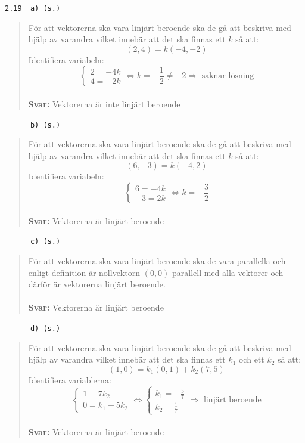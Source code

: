\documentclass[a4paper]{article}
\newcommand{\tskcol}[1]{\textcolor{tskcol}{#1}}
\begin{document}
\texttt{\tskcol{2.19~~a) (s.)}}
\begin{quotation}
	\noindent
	För att vektorerna ska vara linjärt beroende ska de gå att beskriva med hjälp av varandra vilket innebär att det ska finnas ett $k$ så att:
	\[(2,4)=k(-4,-2)\]
	Identifiera variabeln:
	\[\begin{cases}
	2=-4k \\
	4=-2k
	\end{cases} \Leftrightarrow
	k=-\frac{1}{2}\neq-2 \Rightarrow \text{ saknar lösning}\]
	\\
	\textbf{Svar:} Vektorerna är inte linjärt beroende
\end{quotation}

\texttt{\tskcol{~~~~~~b) (s.)}}
\begin{quotation}
	\noindent
	För att vektorerna ska vara linjärt beroende ska de gå att beskriva med hjälp av varandra vilket innebär att det ska finnas ett $k$ så att:
	\[(6,-3)=k(-4,2)\]
	Identifiera variabeln:
	\[\begin{cases}
	6=-4k \\
	-3=2k
	\end{cases} \Leftrightarrow
	k=-\frac{3}{2}\]
	\\
	\textbf{Svar:} Vektorerna är linjärt beroende
\end{quotation}

\texttt{\tskcol{~~~~~~c) (s.)}}
\begin{quotation}
	\noindent
	För att vektorerna ska vara linjärt beroende ska de vara parallella och enligt definition är nollvektorn $(0,0)$ parallell med alla vektorer och därför är vektorerna linjärt beroende.
	\\ \\
	\textbf{Svar:} Vektorerna är linjärt beroende
\end{quotation}

\texttt{\tskcol{~~~~~~d) (s.)}}
\begin{quotation}
	\noindent
	För att vektorerna ska vara linjärt beroende ska de gå att beskriva med hjälp av varandra vilket innebär att det ska finnas ett $k_1$ och ett $k_2$ så att:
	\[(1,0)=k_1(0,1)+k_2(7,5)\]
	Identifiera variablerna:
	\[\begin{cases}
	1=7k_2 \\
	0=k_1+5k_2
	\end{cases} \Leftrightarrow
	\begin{cases}
	k_1=-\frac{5}{7} \\
	k_2=\frac{1}{7}
	\end{cases} \Rightarrow \text{ linjärt beroende}\]
	\\
	\textbf{Svar:} Vektorerna är linjärt beroende
\end{quotation}
\end{document}
